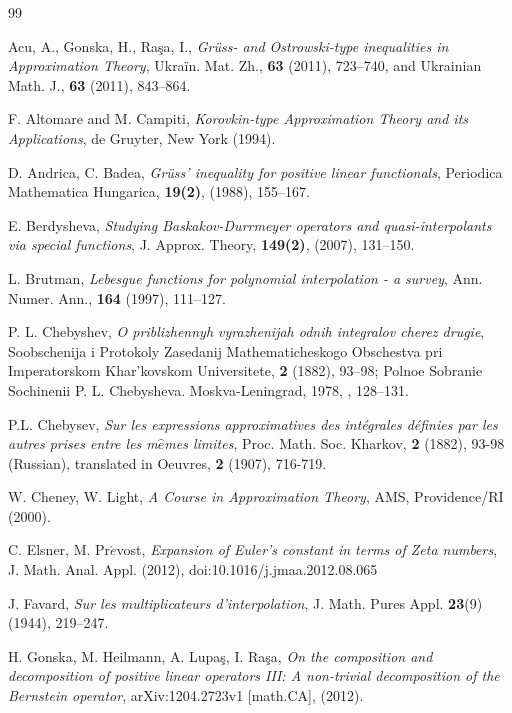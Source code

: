 \documentclass[12pt,leqno,a4paper,dvips,twoside]{article}
\begin{document}
{\begin{thebibliography}{99}

Acu, A., Gonska, H., Ra\c{s}a, I., {\it Gr{\"u}ss- and Ostrowski-type inequalities in Approximation Theory}, Ukra\"{i}n. Mat. Zh., \textbf{63} (2011), 723--740, and Ukrainian Math. J., \textbf{63} (2011), 843--864.

F. Altomare and M. Campiti, {\it Korovkin-type Approximation Theory and its Applications}, de Gruyter, New York (1994).

D. Andrica, C. Badea, {\it Gr\"{u}ss' inequality for positive linear functionals}, Periodica Mathematica Hungarica, \textbf{19(2)}, (1988), 155--167.

E. Berdysheva,  {\it Studying Baskakov-Durrmeyer operators and quasi-interpolants via special functions}, J. Approx. Theory, \textbf{149(2)}, (2007), 131--150.

L. Brutman, {\it Lebesgue functions for polynomial interpolation - a survey}, Ann. Numer. Ann., \textbf{164} (1997), 111--127.

P. L. Chebyshev, {\it O priblizhennyh vyrazhenijah odnih integralov cherez drugie}, Soobschenija i Protokoly Zasedanij Mathematicheskogo Obschestva pri Imperatorskom Khar'kovskom Universitete, \textbf{2} (1882), 93--98; Polnoe Sobranie Sochinenii P. L. Chebysheva. Moskva-Leningrad, 1978, , 128--131.

P.L. Chebysev, {\it Sur les expressions approximatives des
int\'{e}grales d\'{e}finies par les autres prises entre les
m$\hat{e}$mes limites}, Proc. Math. Soc. Kharkov, {\bf 2} (1882), 93-98
(Russian), translated in Oeuvres, {\bf 2} (1907), 716-719.

W. Cheney, W. Light, {\it A Course in Approximation Theory}, AMS, Providence/RI (2000).
 
C. Elsner, M. Pr$\acute{e}$vost, {\it Expansion of Euler's constant in terms of Zeta numbers}, J. Math. Anal. Appl. (2012), doi:10.1016/j.jmaa.2012.08.065

J. Favard, {\it Sur les multiplicateurs d'interpolation}, J. Math. Pures Appl. \textbf{23}(9) (1944), 219--247. 

H. Gonska, M. Heilmann, A. Lupa\c{s}, I. Ra\c{s}a, {\it On the composition and decomposition of positive linear operators III: A non-trivial decomposition of the Bernstein operator}, arXiv:1204.2723v1 [math.CA], (2012). 


\end{thebibliography}}
\end{document}
